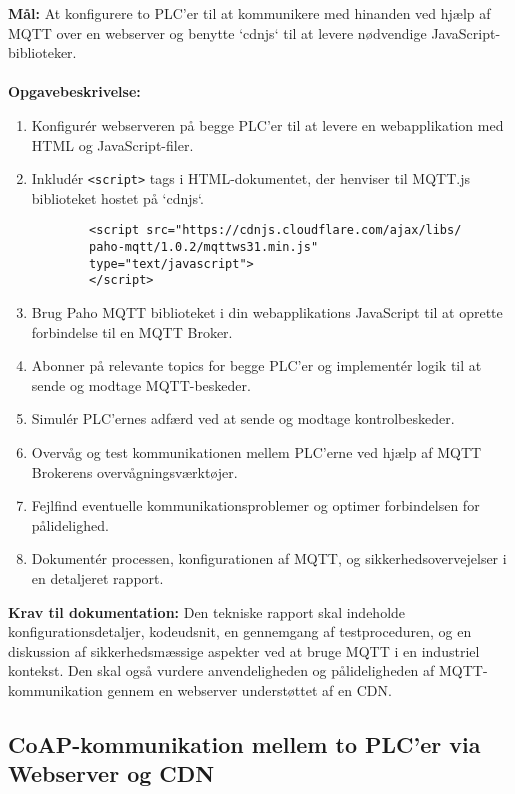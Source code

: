 \textbf{Mål:} At konfigurere to PLC'er til at kommunikere med hinanden ved hjælp af MQTT over en webserver og benytte `cdnjs` til at levere nødvendige JavaScript-biblioteker.
\\\\
\noindent\textbf{Opgavebeskrivelse:}
\begin{enumerate}
	\item Konfigurér webserveren på begge PLC'er til at levere en webapplikation med HTML og JavaScript-filer.
	\item Inkludér \texttt{<script>} tags i HTML-dokumentet, der henviser til MQTT.js biblioteket hostet på `cdnjs`.
	\begin{verbatim}
		<script src="https://cdnjs.cloudflare.com/ajax/libs/
		paho-mqtt/1.0.2/mqttws31.min.js" 
		type="text/javascript">
		</script>
	\end{verbatim}
	\item Brug Paho MQTT biblioteket i din webapplikations JavaScript til at oprette forbindelse til en MQTT Broker.
	\item Abonner på relevante topics for begge PLC'er og implementér logik til at sende og modtage MQTT-beskeder.
	\item Simulér PLC'ernes adfærd ved at sende og modtage kontrolbeskeder.
	\item Overvåg og test kommunikationen mellem PLC'erne ved hjælp af MQTT Brokerens overvågningsværktøjer.
	\item Fejlfind eventuelle kommunikationsproblemer og optimer forbindelsen for pålidelighed.
	\item Dokumentér processen, konfigurationen af MQTT, og sikkerhedsovervejelser i en detaljeret rapport.
\end{enumerate}
\textbf{Krav til dokumentation:} Den tekniske rapport skal indeholde konfigurationsdetaljer, kodeudsnit, en gennemgang af testproceduren, og en diskussion af sikkerhedsmæssige aspekter ved at bruge MQTT i en industriel kontekst. Den skal også vurdere anvendeligheden og pålideligheden af MQTT-kommunikation gennem en webserver understøttet af en CDN.

\subsection*{CoAP-kommunikation mellem to PLC'er via Webserver og CDN}
\label{subsec:coap_communication_plc_cdn}

